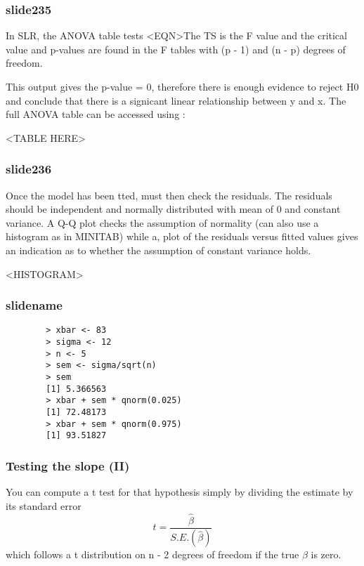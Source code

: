 \documentclass[a4paper,12pt]{article}
\begin{document}
\begin{itemize}
		
		\subsubsection{slide235}
		
		In SLR, the ANOVA table tests <EQN>The TS is the F value and the critical value and p-values are found
		in the F tables with (p - 1) and (n - p) degrees of freedom.
		
		This output gives the p-value = 0, therefore there is enough evidence to reject H0 and conclude that there is a signicant linear relationship between y and x. The full ANOVA table can be accessed using :
		
		<TABLE HERE>
		
		
		
		\subsubsection{slide236}
		Once the model has been tted, must then check the residuals.
		The residuals should be independent and normally distributed with
		mean of 0 and constant variance.
		A Q-Q plot checks the assumption of normality (can also use a
		histogram as in MINITAB) while a, plot of the residuals versus fitted values gives an indication as to whether the assumption of constant variance holds.
		
		<HISTOGRAM>
		
		
		\subsubsection{slidename}
		
		\large \begin{verbatim}
		> xbar <- 83
		> sigma <- 12
		> n <- 5
		> sem <- sigma/sqrt(n)
		> sem
		[1] 5.366563
		> xbar + sem * qnorm(0.025)
		[1] 72.48173
		> xbar + sem * qnorm(0.975)
		[1] 93.51827
		\end{verbatim}\large
		
		
		\subsubsection{Testing the slope (II)}
		
		You can compute a
		t test for that hypothesis simply by dividing the estimate by its standard
		error
		\begin{equation}
		t = \frac{\hat{\beta}}{S.E.(\hat{\beta})}
		\end{equation}
		which follows a t distribution on n - 2 degrees of freedom if the true $\beta$ is
		zero.
		

\end{itemize}
\end{document}
